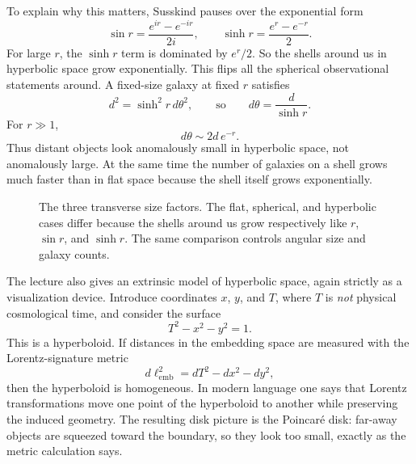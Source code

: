 To explain why this matters, Susskind pauses over the exponential form
\begin{equation}
\sin r = \frac{e^{ir}-e^{-ir}}{2i},
\qquad
\sinh r = \frac{e^{r}-e^{-r}}{2}.
\end{equation}
For large \(r\), the \(\sinh r\) term is dominated by \(e^r/2\). So the shells around us in hyperbolic space grow exponentially. This flips all the spherical observational statements around. A fixed-size galaxy at fixed \(r\) satisfies
\begin{equation}
d^2 = \sinh^2 r\, d\theta^2,
\qquad\text{so}\qquad
d\theta = \frac{d}{\sinh r}.
\end{equation}
For \(r\gg 1\),
\begin{equation}
d\theta \sim 2d\, e^{-r}.
\end{equation}
Thus distant objects look anomalously small in hyperbolic space, not anomalously large. At the same time the number of galaxies on a shell grows much faster than in flat space because the shell itself grows exponentially.

\begin{figure}[htbp]
\centering
{}
\caption{The three transverse size factors. The flat, spherical, and hyperbolic cases differ because the shells around us grow respectively like \(r\), \(\sin r\), and \(\sinh r\). The same comparison controls angular size and galaxy counts.}
\end{figure}

The lecture also gives an extrinsic model of hyperbolic space, again strictly as a visualization device. Introduce coordinates \(x\), \(y\), and \(T\), where \(T\) is \emph{not} physical cosmological time, and consider the surface
\begin{equation}
T^2 - x^2 - y^2 = 1.
\end{equation}
This is a hyperboloid. If distances in the embedding space are measured with the Lorentz-signature metric
\begin{equation}
d\ell_{\mathrm{emb}}^2 = dT^2 - dx^2 - dy^2,
\end{equation}
then the hyperboloid is homogeneous. In modern language one says that Lorentz transformations move one point of the hyperboloid to another while preserving the induced geometry. The resulting disk picture is the Poincar\'e disk: far-away objects are squeezed toward the boundary, so they look too small, exactly as the metric calculation says.

